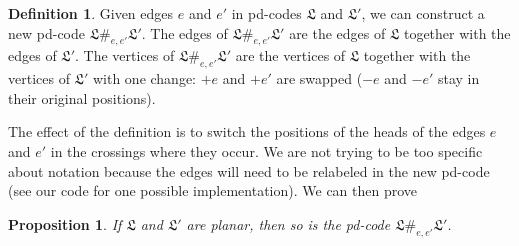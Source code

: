\documentclass[amsmath,secnumarabic,amssymb,floatfix,nofootinbib,nobibnotes,letterpaper,11pt,tightenlines,showkeys]{revtex4}
\newtheorem{proposition}[theorem]{Proposition}
\theoremstyle{definition}
\newtheorem{definition}[theorem]{Definition}
\begin{document}
\begin{definition}
Given edges $e$ and $e'$ in pd-codes $\mathfrak{L}$ and $\mathfrak{L}'$, we can construct a new pd-code $\mathfrak{L} \#_{e,e'} \mathfrak{L'}$. The edges of $\mathfrak{L} \#_{e,e'} \mathfrak{L'}$ are the edges of $\mathfrak{L}$ together with the edges of $\mathfrak{L'}$. The vertices of $\mathfrak{L} \#_{e,e'} \mathfrak{L'}$ are the vertices of $\mathfrak{L}$ together with the vertices of $\mathfrak{L'}$ with one change: $+e$ and $+e'$ are swapped ($-e$ and $-e'$ stay in their original positions).
\end{definition}
The effect of the definition is to switch the positions of the heads of the edges $e$ and $e'$ in the crossings where they occur. We are not trying to be too specific about notation because the edges will need to be relabeled in the new pd-code (see our code for one possible implementation).
We can then prove
\begin{proposition}
If $\mathfrak{L}$ and $\mathfrak{L'}$ are planar, then so is the pd-code $\mathfrak{L} \#_{e,e'} \mathfrak{L'}$.
\end{proposition}
\end{document}
